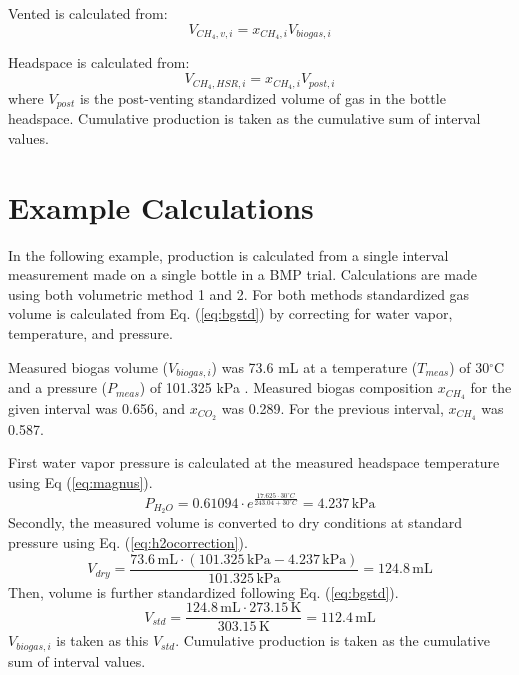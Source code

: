 \documentclass[]{article}
\newcommand{\unit}[1]{\ensuremath{\, \mathrm{#1}}}
\begin{document}
Vented  is calculated from:
\begin{equation}
  V_{CH_4, v, i} = x_{CH_4, i} V_{biogas, i}
\end{equation}

Headspace  is calculated from:
\begin{equation}
  V_{CH_4, HSR, i} = x_{CH_4, i} V_{post, i}
\end{equation}
where $V_{post}$ is the post-venting standardized volume of gas in the bottle headspace.
Cumulative production is taken as the cumulative sum of interval values. 

\section{Example Calculations}
In the following example,  production is calculated from a single interval measurement made on a single bottle in a BMP trial. Calculations are made using both volumetric method 1 and 2. 
For both methods standardized gas volume is calculated from Eq. (\ref{eq:bgstd}) by correcting for water vapor, temperature, and pressure.

Measured biogas volume ($V_{biogas,i}$) was 73.6 mL at a temperature ($T_{meas}$) of 30$^\circ$C and a pressure ($P_{meas}$) of 101.325 kPa .
Measured biogas composition $x_{CH_4}$ for the given interval was 0.656, and $x_{CO_2}$ was 0.289. For the previous interval, $x_{CH_4}$ was 0.587.

First water vapor pressure is calculated at the measured headspace temperature using Eq (\ref{eq:magnus}).
\begin{equation*}
   P_{H_2O} = 0.61094 \cdot e^{\frac{17.625 \cdot 30^\circ C}{243.04 + 30^\circ C}} = 4.237\unit{kPa}
\end{equation*}
Secondly, the measured volume is converted to dry conditions at standard pressure using Eq. (\ref{eq:h2ocorrection}).
\begin{equation*}
   V_{dry} = \frac{73.6\unit{mL} \cdot (101.325\unit{kPa} - 4.237\unit{kPa})}{101.325\unit{kPa}} = 124.8\unit{mL}  
\end{equation*}
Then, volume is further standardized following Eq. (\ref{eq:bgstd}).
\begin{equation*}
    V_{std} = \frac{124.8\unit{mL} \cdot 273.15\unit{K}}{303.15\unit{K}} = 112.4\unit{mL}  
\end{equation*}
$V_{biogas,i}$ is taken as this $V_{std}$. Cumulative production is taken as the cumulative sum of interval values.
\end{document}
